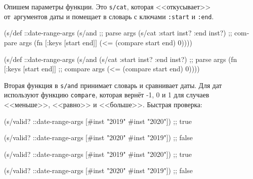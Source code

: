 Опишем параметры функции. Это \verb|s/cat|, которая <<откусывает>>
от~аргументов даты и помещает в словарь с ключами \verb|:start| и
\verb|:end|.

\ifx\devicetype\mobile

\begin{english}
  \begin{clojure}
(s/def ::date-range-args
  (s/and
    ;; parse args
    (s/cat :start inst? :end inst?)
    ;; compare args
    (fn [{:keys [start end]}]
      (<= (compare start end) 0))))
  \end{clojure}
\end{english}

\else

\begin{english}
  \begin{clojure}
(s/def ::date-range-args
  (s/and
   (s/cat :start inst? :end inst?) ;; parse args
   (fn [{:keys [start end]}]       ;; compare args
     (<= (compare start end) 0))))
  \end{clojure}
\end{english}

\fi


Вторая функция в \verb|s/and| принимает словарь и сравнивает даты. Для дат
используют функцию \verb|compare|, которая вернёт -1, 0 и 1 для случаев
<<меньше>>, <<равно>> и <<больше>>. Быстрая проверка:

\ifx\devicetype\mobile

\begin{english}
  \begin{clojure}
(s/valid? ::date-range-args
          [#inst "2019" #inst "2020"])
;; true

(s/valid? ::date-range-args
          [#inst "2020" #inst "2019"])
;; false
  \end{clojure}
\end{english}

\else

\begin{english}
  \begin{clojure}
(s/valid? ::date-range-args
          [#inst "2019" #inst "2020"]) ;; true

(s/valid? ::date-range-args
          [#inst "2020" #inst "2019"]) ;; false
  \end{clojure}
\end{english}

\fi


